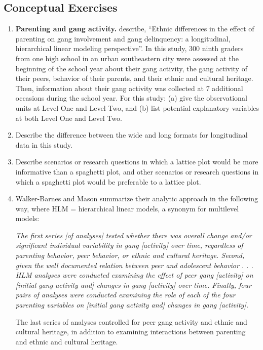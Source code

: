 \documentclass[
]{krantz}
\begin{document}
\subsection{Conceptual Exercises}\label{conceptual-exercises-6}

\begin{enumerate}
\def\labelenumi{\arabic{enumi}.}
\item
  \textbf{Parenting and gang activity.} \citet{Walker-Barnes2001} describe, ``Ethnic differences in the effect of parenting on gang involvement and gang delinquency: a longitudinal, hierarchical linear modeling perspective''. In this study, 300 ninth graders from one high school in an urban southeastern city were assessed at the beginning of the school year about their gang activity, the gang activity of their peers, behavior of their parents, and their ethnic and cultural heritage. Then, information about their gang activity was collected at 7 additional occasions during the school year. For this study: (a) give the observational units at Level One and Level Two, and (b) list potential explanatory variables at both Level One and Level Two.
\item
  Describe the difference between the wide and long formats for longitudinal data in this study.
\item
  Describe scenarios or research questions in which a lattice plot would be more informative than a spaghetti plot, and other scenarios or research questions in which a spaghetti plot would be preferable to a lattice plot.
\item
  Walker-Barnes and Mason summarize their analytic approach in the following way, where HLM = hierarchical linear models, a synonym for multilevel models:

  \emph{The first series {[}of analyses{]} tested whether there was overall change and/or significant individual variability in gang {[}activity{]} over time, regardless of parenting behavior, peer behavior, or ethnic and cultural heritage. Second, given the well documented relation between peer and adolescent behavior . . . HLM analyses were conducted examining the effect of peer gang {[}activity{]} on {[}initial gang activity and{]} changes in gang {[}activity{]} over time. Finally, four pairs of analyses were conducted examining the role of each of the four parenting variables on {[}initial gang activity and{]} changes in gang {[}activity{]}.}

  The last series of analyses controlled for peer gang activity and ethnic and cultural heritage, in addition to examining interactions between parenting and ethnic and cultural heritage.


\end{enumerate}
\end{document}
